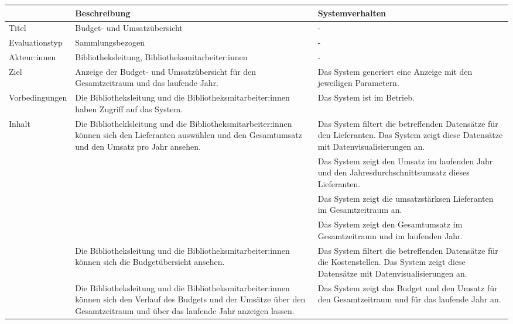 \begingroup
\setlength{\tabcolsep}{9pt} %
\renewcommand{\arraystretch}{1.10} 
\begin{table}[h]
    \centering
    \begin{adjustbox}{max width=\textwidth}
    \begin{tabular}{lp{7.0cm}p{7.0cm}}
       \toprule
       \textbf{}          & \textbf{Beschreibung} &\textbf{Systemverhalten}\\
       \midrule
        Titel                            &Budget- und Umsatzübersicht& -\\
        Evaluationstyp                   &Sammlungsbezogen                   & -\\
        Akteur:innen                     &Bibliotheksleitung, Bibliotheksmitarbeiter:innen& -\\
        Ziel                             &Anzeige der Budget- und Umsatzübersicht für den Gesamtzeitraum und das laufende Jahr.& Das System generiert eine Anzeige mit den jeweiligen Parametern.\\
        Vorbedingungen                   &Die Bibliotheksleitung und die Bibliotheksmitarbeiter:innen haben Zugriff auf das System.& Das System ist im Betrieb.\\
        Inhalt                           &Die Bibliotheklsleitung und die Bibliotheksmitarbeiter:innen können sich den Lieferanten auswählen und den Gesamtumsatz und den Umsatz pro Jahr ansehen.& Das System filtert die betreffenden Datensätze für den Lieferanten. Das System zeigt diese Datensätze mit Datenvisualisierungen an.\\
                                        & &Das System zeigt den Umsatz im laufenden Jahr und den Jahresdurchschnittsumsatz dieses Lieferanten.\\
                                        & &Das System zeigt die umsatzstärksen Lieferanten im Gesamtzeitraum an.\\
                                        & &Das System zeigt den Gesamtumsatz im Gesamtzeitraum und im laufenden Jahr.\\
                                         &Die Bibliotheksleitung und die Bibliotheksmitarbeiter:innen können sich die Budgetübersicht ansehen. &Das System filtert die betreffenden Datensätze für die Kostenstellen. Das System zeigt diese Datensätze mit Datenvisualisierungen an.\\
                                         &Die Bibliotheksleitung und die Bibliotheksmitarbeiter:innen können sich den Verlauf des Budgets und der Umsätze über den Gesamtzeitraum und über das laufende Jahr anzeigen lassen. &Das System zeigt das Budget und den Umsatz für den Gesamtzeitraum und für das laufende Jahr an.\\

\end{tabular}
\end{adjustbox}
\end{table}
